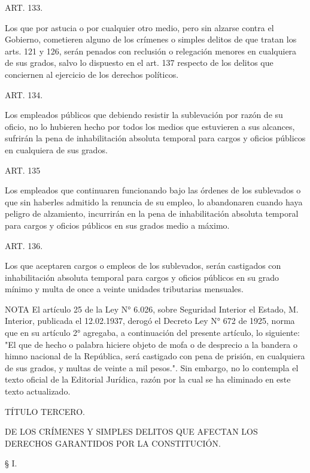     ART. 133.

    Los que por astucia o por cualquier otro medio, pero sin alzarse contra el Gobierno, cometieren alguno de los crímenes o simples delitos de que tratan los arts. 121 y 126, serán penados con reclusión o relegación menores en cualquiera de sus grados, salvo lo dispuesto en el art. 137 respecto de los delitos que conciernen al ejercicio de los derechos políticos.


    ART. 134.

    Los empleados públicos que debiendo resistir la sublevación por razón de su oficio, no lo hubieren hecho por todos los medios que estuvieren a sus alcances, sufrirán la pena de inhabilitación absoluta temporal para cargos y oficios públicos en cualquiera de sus grados.



    ART. 135

    Los empleados que continuaren funcionando bajo las órdenes de los sublevados o que sin haberles admitido la renuncia de su empleo, lo abandonaren cuando haya peligro de alzamiento, incurrirán en la pena de inhabilitación absoluta temporal para cargos y oficios públicos en sus grados medio a máximo.


    ART. 136.

    Los que aceptaren cargos o empleos de los sublevados, serán castigados con inhabilitación absoluta temporal para cargos y oficios públicos en su grado mínimo y multa de once a veinte unidades tributarias mensuales.
   




NOTA
      El artículo 25 de la Ley N° 6.026, sobre Seguridad Interior el Estado, M. Interior, publicada el 12.02.1937, derogó el Decreto Ley N° 672 de 1925, norma que en su artículo 2° agregaba, a continuación del presente artículo, lo siguiente: "El que de hecho o palabra hiciere objeto de mofa o de desprecio a la bandera o himno nacional de la República, será castigado con pena de prisión, en cualquiera de sus grados, y multas de veinte a mil pesos.". Sin embargo, no lo contempla el texto oficial de la Editorial Jurídica, razón por la cual se ha eliminado en este texto actualizado.

    TÍTULO TERCERO.

    DE LOS CRÍMENES Y SIMPLES DELITOS QUE AFECTAN LOS DERECHOS GARANTIDOS POR LA CONSTITUCIÓN.





    § I.

